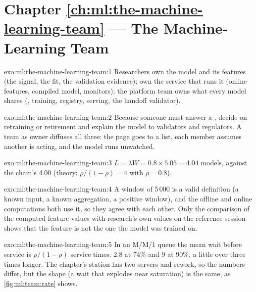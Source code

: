 \section*{Chapter \ref{ch:ml:the-machine-learning-team} --- The Machine-Learning Team}

\begin{solution}{exo:ml:the-machine-learning-team:1}
Researchers own the model and its features (the signal, the fit, the validation evidence);  own the
service that runs it (online features, compiled model, monitors); the platform team owns what every model shares (,
training, registry, serving, the handoff validator).
\end{solution}

\begin{solution}{exo:ml:the-machine-learning-team:2}
Because someone must answer a , decide on retraining or retirement and explain the model to validators and
regulators. A team as owner diffuses all three: the page goes to a list, each member assumes another is acting, and the model runs
unwatched.
\end{solution}

\begin{solution}{exo:ml:the-machine-learning-team:3}
$L=\lambda W=0.8\times5.05=4.04$ models, against the chain's 4.00 (theory: $\rho/(1-\rho)=4$ with $\rho=0.8$).
\end{solution}

\begin{solution}{exo:ml:the-machine-learning-team:4}
A window of 5\,000 is a valid definition (a known input, a known aggregation, a positive window), and the offline and online
computations both use it, so they agree with each other. Only the comparison of the computed feature values with research's own
values on the reference session shows that the feature is not the one the model was trained on.
\end{solution}

\begin{solution}{exo:ml:the-machine-learning-team:5}
In an M/M/1 queue the mean wait before service is $\rho/(1-\rho)$ service times: 2.8 at 74\% and 9 at 90\%, a little over three
times longer. The chapter's station has two servers and rework, so the numbers differ, but the shape (a wait that explodes near
saturation) is the same, as \cref{fig:ml:team:rate} shows.
\end{solution}

